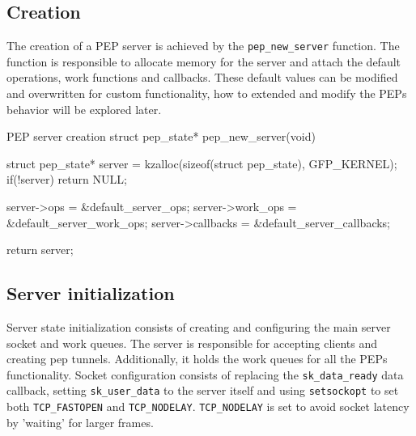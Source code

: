 \documentclass[a4paper,english, 11pt]{report}
\begin{document}
\subsection{Creation}

The creation of a PEP server is achieved by the \verb|pep_new_server| function. The function is responsible to allocate memory for the server and attach the default operations, work functions and callbacks. These default values can be modified and overwritten for custom functionality, how to extended and modify the PEPs behavior will be explored later.

\begin{autonumlstlisting}[label=lst:pep_creation]{PEP server creation}
struct pep_state* pep_new_server(void)
{
    struct pep_state* server = kzalloc(sizeof(struct pep_state), GFP_KERNEL);
    if(!server){
        return NULL;
    }

    server->ops = &default_server_ops;
    server->work_ops = &default_server_work_ops;
    server->callbacks = &default_server_callbacks;

    return server;
}
\end{autonumlstlisting}

\subsection{Server initialization}
Server state initialization consists of creating and configuring the main server socket and work queues. The server is responsible for accepting clients and creating pep tunnels. Additionally, it holds the work queues for all the PEPs functionality. Socket configuration consists of replacing the \verb|sk_data_ready| data callback, setting \verb|sk_user_data| to the server itself and using \verb|setsockopt| to set both \verb|TCP_FASTOPEN| and \verb|TCP_NODELAY|. \verb|TCP_NODELAY| is set to avoid socket latency by 'waiting' for larger frames.
\end{document}
